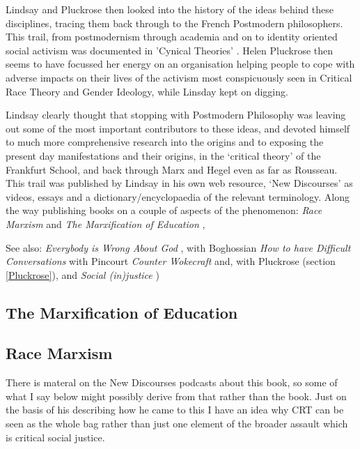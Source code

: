 \documentclass[10pt,titlepage]{book}
\begin{document}
Lindsay and Pluckrose then looked into the history of the ideas behind these disciplines, tracing them back through to the French Postmodern philosophers.
This trail, from postmodernism through academia and on to identity oriented social activism was documented in 'Cynical Theories' \cite{pluckrose-cynical}.
Helen Pluckrose then seems to have focussed her energy on an organisation helping people to cope with adverse impacts on their lives of the activism most conspicuously seen in Critical Race Theory and Gender Ideology, while Linsday kept on digging.

Lindsay clearly thought that stopping with Postmodern Philosophy was leaving out some of the most important contributors to these ideas, and devoted himself to much more comprehensive research into the origins and to exposing the present day manifestations and their origins, in the `critical theory' of the Frankfurt School, and back through Marx and Hegel even as far as Rousseau.
This trail was published by Lindsay in his own web resource, `New Discourses' as videos, essays and a dictionary/encyclopaedia of the relevant terminology.
Along the way publishing books on a couple of aspects of the phenomenon: \emph{Race Marxism} \cite{lindsay-racemarx} and \emph{The Marxification of Education} \cite{lindsay-marxedu},

See also: \emph{Everybody is Wrong About God} \cite{lindsay-everybody},
with Boghossian \emph{How to have Difficult Conversations} \cite{boghossian-conversations}
with Pincourt \emph{Counter Wokecraft} \cite{pincourt-cw}
and, with Pluckrose (section \ref{Pluckrose}),
and \emph{Social (in)justice} \cite{pluckrose-socinj})

\subsection{The Marxification of Education \cite{lindsay-marxedu}}


\subsection{Race Marxism \cite{lindsay-racemarx}}

There is materal on the New Discourses podcasts \cite{lindsay-discourses} about this book, so some of what I say below might possibly derive from that rather than the book.
Just on the basis of his describing how he came to this I have an idea why CRT can be seen as the whole bag rather than just one element of the broader assault which is critical social justice.
\end{document}
